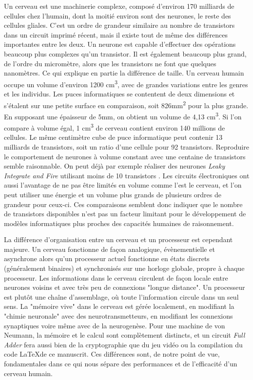 	Un cerveau est une machinerie complexe, composé d'environ 170 milliards de cellules chez l'humain, dont la moitié environ sont des neurones, le reste des cellules gliales. C'est un ordre de grandeur similaire au nombre de transistors dans un circuit imprimé récent, mais il existe tout de même des différences importantes entre les deux. Un neurone est capable d'effectuer des opérations beaucoup plus complexes qu'un transistor. Il est également beaucoup plus grand, de l'ordre du micromètre, alors que les transistors ne font que quelques nanomètres. Ce qui explique en partie la différence de taille. Un cerveau humain occupe un volume d'environ 1200 cm\textsuperscript{3}, avec de grandes variations entre les genres et les individus. Les puces informatiques se contentent de deux dimensions et s'étalent sur une petite surface en comparaison, soit 826mm\textsuperscript{2} pour la plus grande. En supposant une épaisseur de 5mm, on obtient un volume de 4,13 cm\textsuperscript{3}. Si l'on compare à volume égal, 1 cm\textsuperscript{3} de cerveau contient environ 140 millions de cellules. Le même centimètre cube de puce informatique peut contenir 13 milliards de transistors, soit un ratio d'une cellule pour 92 transistors. Reproduire le comportement de neurones à volume constant avec une centaine de transistors semble raisonnable. On peut déjà par exemple réaliser des neurones \textit{Leaky Integrate and Fire} utilisant moins de 10 transistors \cite{park2021integrate}. Les circuits électroniques ont aussi l'avantage de ne pas être limités en volume comme l'est le cerveau, et l'on peut utiliser une énergie et un volume plus grands de plusieurs ordres de grandeur pour ceux-ci. Ces comparaisons semblent donc indiquer que le nombre de transistors disponibles n'est pas un facteur limitant pour le développement de modèles informatiques plus proches des capacités humaines de raisonnement.

	La différence d'organisation entre un cerveau et un processeur est cependant majeure. Un cerveau fonctionne de façon analogique, évènementielle et asynchrone alors qu'un processeur actuel fonctionne en états discrets (généralement binaires) et synchronisés sur une horloge globale, propre à chaque processeur. Les informations dans le cerveau circulent de façon locale entre neurones voisins et avec très peu de connexions "longue distance". Un processeur est plutôt une chaîne d'assemblage, où toute l'information circule dans un seul sens. La "mémoire vive" dans le cerveau est gérée localement, en modifiant la "chimie neuronale" avec des neurotransmetteurs, en modifiant les connexions synaptiques voire même avec de la neurogenèse. Pour une machine de von Neumann, la mémoire et le calcul sont complètement distincts, et un circuit \textit{Full Adder} fera aussi bien de la cryptographie que du jeu vidéo ou la compilation du code \LaTeX de ce manuscrit. Ces différences sont, de notre point de vue, fondamentales dans ce qui nous sépare des performances et de l'efficacité d'un cerveau humain.

